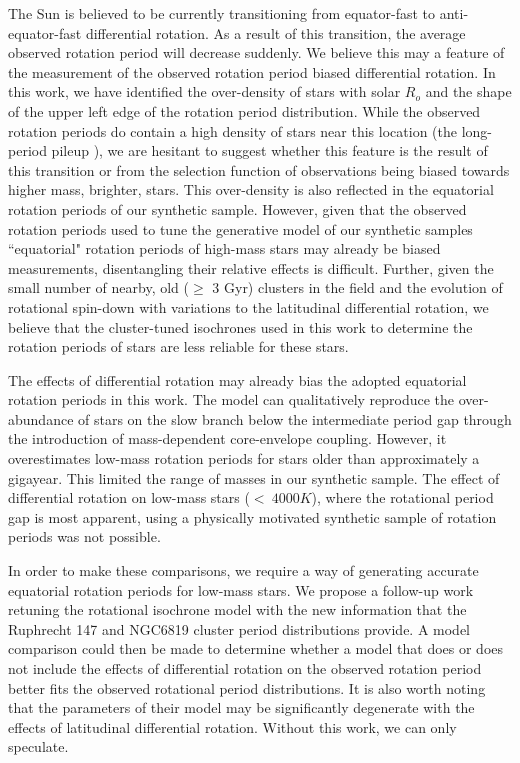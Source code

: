 The Sun is believed to be currently transitioning from equator-fast to anti-equator-fast differential rotation.
As a result of this transition, the average observed rotation period will decrease suddenly.
We believe this may a feature of the measurement of the observed rotation period biased differential rotation.
In this work, we have identified the over-density of stars with solar $R_o$ and the shape of the upper left edge of the rotation period distribution.
While the observed \kepler{} rotation periods do contain a high density of stars near this location (the long-period pileup \citep{van_saders_forward_2019} ), we are hesitant to suggest whether this feature is the result of this transition or from the selection function of \kepler{} observations being biased towards higher mass, brighter, stars.
This over-density is also reflected in the equatorial rotation periods of our synthetic sample.
However, given that the observed rotation periods used to tune the generative model of our synthetic samples ``equatorial" rotation periods of high-mass stars may already be biased measurements, disentangling their relative effects is difficult.
Further, given the small number of nearby, old ($\geq$ 3 Gyr) clusters in the \kepler{} field and the evolution of rotational spin-down with variations to the latitudinal differential rotation, we believe that the cluster-tuned isochrones used in this work to determine the rotation periods of stars are less reliable for these stars.

The effects of differential rotation may already bias the adopted equatorial rotation periods in this work.
The \citet{spada_competing_2020} model can qualitatively reproduce the over-abundance of stars on the slow branch below the intermediate period gap through the introduction of mass-dependent core-envelope coupling.
However, it overestimates low-mass rotation periods for stars older than approximately a gigayear.
This limited the range of masses in our synthetic sample.
The effect of differential rotation on low-mass stars ($< \ 4000 K$), where the rotational period gap is most apparent, using a physically motivated synthetic sample of rotation periods was not possible.

In order to make these comparisons, we require a way of generating accurate equatorial rotation periods for low-mass stars.
We propose a follow-up work retuning the rotational isochrone model with the new information that the Ruphrecht 147 \citep{curtis_when_2020} and NGC6819 \citep{meibom_kepler_2011} cluster period distributions provide.
A model comparison could then be made to determine whether a model that does or does not include the effects of differential rotation on the observed rotation period better fits the observed rotational period distributions.
It is also worth noting that the parameters of their model may  be significantly degenerate with the effects of latitudinal differential rotation.
Without this work, we can only speculate.
 
